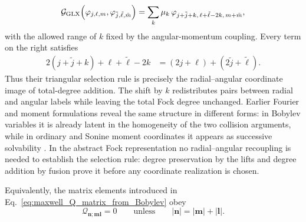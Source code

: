 \documentclass[11pt,oneside]{article}
\numberwithin{equation}{section}
\theoremstyle{definition}
\begin{document}
\begin{equation}
\mathcal G_{\rm GLX}\!\left(
\varphi_{j,\ell,m},
\varphi_{\tilde j,\tilde\ell,\tilde m}
\right)
=
\sum_k
\mu_k\,
\varphi_{
j+\tilde j+k,\,
\ell+\tilde\ell-2k,\,
m+\tilde m},
\label{eq:maxwell_GLX_triangular_coordinate_rule}
\end{equation}
with the allowed range of $k$ fixed by the angular-momentum coupling.  Every
term on the right satisfies
\begin{align}
2(j+\tilde j+k)+\ell+\tilde\ell-2k
&=
(2j+\ell)+(2\tilde j+\tilde\ell).
\label{eq:maxwell_GLX_degree_addition}
\end{align}
Thus their triangular selection rule is precisely the radial--angular
coordinate image of total-degree addition.  The shift by $k$ redistributes
pairs between radial and angular labels while leaving the total Fock degree
unchanged.  Earlier Fourier and moment formulations reveal the same
structure in different forms: in Bobylev variables it is already latent in
the homogeneity of the two collision arguments, while in ordinary and
Sonine moment coordinates it appears as successive solvability
\cite{Bobylev1975Fourier,Bobylev1984ExactRelaxation,Bobylev1988MaxwellReview,Ernst1979MaxwellMoments}.
In the abstract Fock representation no radial--angular recoupling is needed
to establish the selection rule: degree preservation by the lifts and
degree addition by fusion prove it before any coordinate realization is
chosen.

Equivalently, the matrix elements introduced in Eq.~\eqref{eq:maxwell_Q_matrix_from_Bobylev} obey
\begin{equation}
\mathcal Q_{\bm n;\bm m\bm l}=0
\qquad\text{unless}\qquad
|\bm n|=|\bm m|+|\bm l|.
\label{eq:maxwell_selection_rule}
\end{equation}
\end{document}
